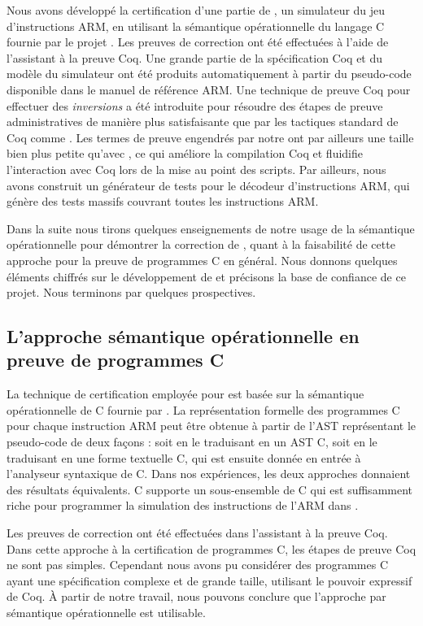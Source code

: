 Nous avons développé la certification d'une partie de \simlight,
un simulateur du jeu d'instructions ARM,
en utilisant la sémantique opérationnelle du langage C fournie par le projet \compcert.
Les preuves de correction ont été effectuées à l'aide de l'assistant à la preuve Coq.
Une grande partie de la spécification Coq et du modèle du simulateur ont été produits
automatiquement à partir du pseudo-code disponible dans le manuel de référence ARM.
Une technique de preuve Coq pour effectuer des \emph{inversions} a été introduite
pour résoudre des étapes de preuve administratives de manière plus satisfaisante
que par les tactiques standard de Coq comme \inversion.
Les termes de preuve engendrés par notre \hcinv ont par ailleurs une taille
bien plus petite qu'avec \inversion,
ce qui améliore la compilation Coq et fluidifie l'interaction avec Coq lors de la mise
au point des scripts.
Par ailleurs, nous avons construit un générateur de tests pour le décodeur 
d'instructions ARM, qui génère des tests massifs couvrant toutes les instructions ARM.

Dans la suite nous tirons quelques enseignements de notre usage 
de la sémantique opérationnelle pour démontrer la correction de \simlight,
quant à la faisabilité de cette approche pour la preuve de programmes C en général.
Nous donnons quelques éléments chiffrés sur le développement de \simsoccert
et précisons la base de confiance de ce projet.
Nous terminons par quelques prospectives.


\subsection*{L'approche sémantique opérationnelle en preuve de programmes C}

La technique de certification employée pour \simlight est basée sur la sémantique
opérationnelle de C fournie par \compcert. La représentation formelle des
programmes C pour chaque instruction ARM peut être obtenue à partir 
de l'AST représentant le pseudo-code de deux façons :
soit en le traduisant en un AST \compcert C, 
soit en le traduisant en une forme textuelle C,
qui est ensuite donnée en entrée à l'analyseur syntaxique de \compcert C.
Dans nos expériences, les deux approches donnaient des résultats équivalents.
\compcert C supporte un sous-ensemble de C qui est suffisamment riche
pour programmer la simulation des instructions de l'ARM dans \simlight.

Les preuves de correction ont été effectuées dans l'assistant à la preuve Coq.
Dans cette approche à la certification de programmes C, les étapes de preuve Coq
ne sont pas simples. 
Cependant nous avons pu considérer des programmes C ayant une spécification
complexe et de grande taille, utilisant le pouvoir expressif de Coq.
À partir de notre travail, nous pouvons conclure que l'approche
par sémantique opérationnelle est utilisable.

